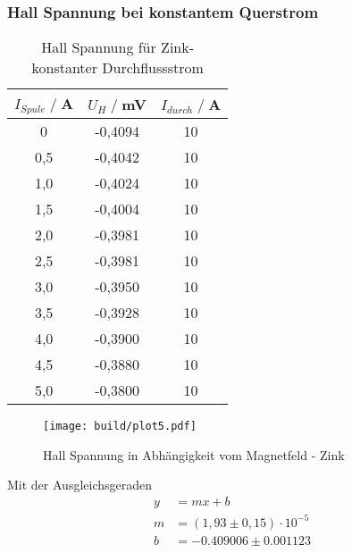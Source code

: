 \subsubsection{Hall Spannung bei konstantem Querstrom}
\begin{table}
    \centering
    \begin{tabular}{c c c}
        \toprule
        $I_{Spule} \;/\;$A & $U_H\;/\;$mV & $I_{durch} \;/\;$A\\
        \midrule
            0                   &-0,4094&             10\\
            0,5                 &-0,4042&             10\\
            1,0                 &-0,4024&             10\\
            1,5                 &-0,4004&             10\\
            2,0                 &-0,3981&             10\\
            2,5                 &-0,3981&             10\\
            3,0                 &-0,3950&             10\\
            3,5                 &-0,3928&             10\\
            4,0                 &-0,3900&             10\\
            4,5                 &-0,3880&             10\\
            5,0                 &-0,3800&             10\\
        \bottomrule
    \end{tabular}
    \caption{Hall Spannung für Zink- konstanter Durchflussstrom}
    \label{tab:Zn_B}
\end{table}
\begin{figure}[H]
    \centering
    \texttt{[image: build/plot5.pdf]}
    \caption{Hall Spannung in Abhängigkeit vom Magnetfeld - Zink}
    \label{fig:Zn_B}
\end{figure}
Mit der Ausgleichsgeraden
\begin{align*}
    y &= mx + b\\
    m &= (1,93\pm 0,15)\cdot 10^{-5}\\
    b &=  -0.409006\pm 0.001123\\ %
\end{align*}

